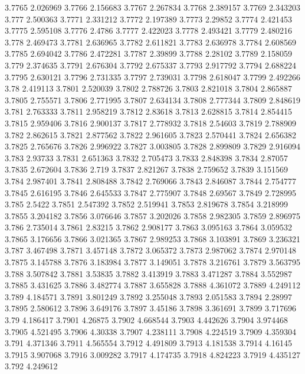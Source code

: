 3.7765  2.026969
3.7766  2.156683
3.7767  2.267834
3.7768  2.389157
3.7769  2.343203
3.777  2.500363
3.7771  2.331212
3.7772  2.197389
3.7773  2.29852
3.7774  2.421453
3.7775  2.595108
3.7776  2.4786
3.7777  2.422023
3.7778  2.493421
3.7779  2.480216
3.778  2.469473
3.7781  2.636965
3.7782  2.611821
3.7783  2.636978
3.7784  2.608569
3.7785  2.694042
3.7786  2.472281
3.7787  2.39899
3.7788  2.28102
3.7789  2.158059
3.779  2.374635
3.7791  2.676304
3.7792  2.675337
3.7793  2.917792
3.7794  2.688224
3.7795  2.630121
3.7796  2.731335
3.7797  2.739031
3.7798  2.618047
3.7799  2.492266
3.78  2.419113
3.7801  2.520039
3.7802  2.788726
3.7803  2.821018
3.7804  2.865887
3.7805  2.755571
3.7806  2.771995
3.7807  2.634134
3.7808  2.777344
3.7809  2.848619
3.781  2.763333
3.7811  2.958219
3.7812  2.83618
3.7813  2.628815
3.7814  2.854415
3.7815  2.959406
3.7816  2.900137
3.7817  2.778932
3.7818  2.54603
3.7819  2.788909
3.782  2.862615
3.7821  2.877562
3.7822  2.961605
3.7823  2.570441
3.7824  2.656382
3.7825  2.765676
3.7826  2.996922
3.7827  3.003805
3.7828  2.899809
3.7829  2.916094
3.783  2.93733
3.7831  2.651363
3.7832  2.705473
3.7833  2.848398
3.7834  2.87057
3.7835  2.672604
3.7836  2.719
3.7837  2.821267
3.7838  2.759652
3.7839  3.151569
3.784  2.987401
3.7841  2.808488
3.7842  2.769066
3.7843  2.846087
3.7844  2.754777
3.7845  2.616195
3.7846  2.645533
3.7847  2.775907
3.7848  2.69567
3.7849  2.728995
3.785  2.5422
3.7851  2.547392
3.7852  2.519941
3.7853  2.819678
3.7854  3.218999
3.7855  3.204182
3.7856  3.076646
3.7857  3.202026
3.7858  2.982305
3.7859  2.896975
3.786  2.735014
3.7861  2.83215
3.7862  2.908177
3.7863  3.095163
3.7864  3.059532
3.7865  3.176656
3.7866  3.021365
3.7867  2.989253
3.7868  3.103891
3.7869  3.236321
3.787  3.467498
3.7871  3.457148
3.7872  3.065372
3.7873  2.987062
3.7874  2.970148
3.7875  3.145788
3.7876  3.183984
3.7877  3.149051
3.7878  3.216761
3.7879  3.563795
3.788  3.507842
3.7881  3.53835
3.7882  3.413919
3.7883  3.471287
3.7884  3.552987
3.7885  3.431625
3.7886  3.482774
3.7887  3.655828
3.7888  4.361072
3.7889  4.249112
3.789  4.184571
3.7891  3.801249
3.7892  3.255048
3.7893  2.051583
3.7894  2.28997
3.7895  2.580612
3.7896  3.649176
3.7897  3.45186
3.7898  3.361691
3.7899  3.717696
3.79  4.186417
3.7901  4.26875
3.7902  4.668544
3.7903  4.442626
3.7904  3.974468
3.7905  4.521495
3.7906  4.30338
3.7907  4.238111
3.7908  4.224519
3.7909  4.359304
3.791  4.371346
3.7911  4.565554
3.7912  4.491809
3.7913  4.181538
3.7914  4.16145
3.7915  3.907068
3.7916  3.009282
3.7917  4.174735
3.7918  4.824223
3.7919  4.435127
3.792  4.249612
